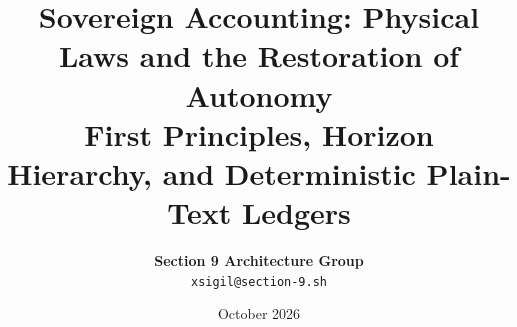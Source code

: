\documentclass[11pt, a4paper]{report}
\begin{document}
\title{\Huge \textbf{Sovereign Accounting: Physical Laws and the Restoration of Autonomy}\\[4mm]
\Large First Principles, Horizon Hierarchy, and Deterministic Plain-Text Ledgers}
\author{\textbf{Section 9 Architecture Group} \\ \texttt{xsigil@section-9.sh}}
\date{October 2026}
\maketitle
\tableofcontents
\newpage










\end{document}
